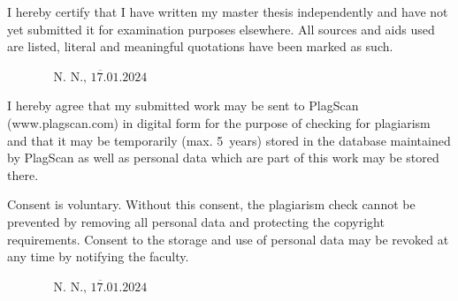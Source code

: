 \documentclass[12pt,twoside,a4paper,parskip]{scrbook} %
\def\BaAuthor{Mahesh Saravanan \\~K54723}
\def\SubmitDate{17.01.2024}
\def\ShowBaAuthor{\BaAuthor}
\def\ShowBaAuthor{N.~N.}
\begin{document}
I hereby certify that I have written my master thesis independently and have not yet submitted it for examination purposes elsewhere. All sources and aids used are listed, literal and meaningful quotations have been marked as such.

\vspace{20pt}
\begin{flushright}
$\overline{~~~~~~~~~~~~~~~~~\mbox{\ShowBaAuthor, \SubmitDate}~~~~~~~~~~~~~~~~~}$
\end{flushright}


I hereby agree that my submitted work may be sent to PlagScan (www.plagscan.com) in digital form for the purpose of checking for plagiarism and that it may be temporarily (max. 5~years) stored in the database maintained by PlagScan as well as personal data which are part of this work may be stored there.

\begin{small}
Consent is voluntary. Without this consent, the plagiarism check cannot be prevented by removing all personal data and protecting the copyright requirements. Consent to the storage and use of personal data may be revoked at any time by notifying the faculty.
\end{small}

\vspace{20pt}
\begin{flushright}
$\overline{~~~~~~~~~~~~~~~~~\mbox{\ShowBaAuthor, \SubmitDate}~~~~~~~~~~~~~~~~~}$
\end{flushright}
\end{document}
